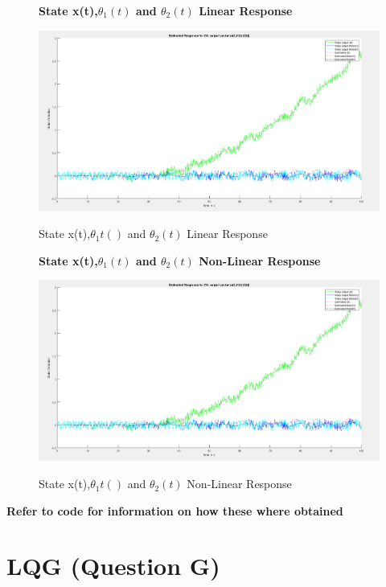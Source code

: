 \documentclass[12pt]{article}
\begin{document}
\begin{figure}[H]
    \centering
    \textbf{State x(t),$\theta_1(t)$ and $\theta_2(t)$ Linear Response}\par\medskip
    \includegraphics[scale = 0.35]{StateXth1th2NonLinearResponse.png}\\[0.0 cm]	%
    \caption{State x(t),$\theta_1t()$ and $\theta_2(t)$ Linear Response} 
\end{figure}

\begin{figure}[H]
    \centering
    \textbf{State x(t),$\theta_1(t)$ and $\theta_2(t)$ Non-Linear Response}\par\medskip
    \includegraphics[scale = 0.35]{StateXth1th2NonLinearResponse.png}\\[0.0 cm]	%
    \caption{State x(t),$\theta_1t()$ and $\theta_2(t)$ Non-Linear Response} 
\end{figure}

\textbf{Refer to code for information on how these where obtained}

\section{LQG (Question G)}
\end{document}
